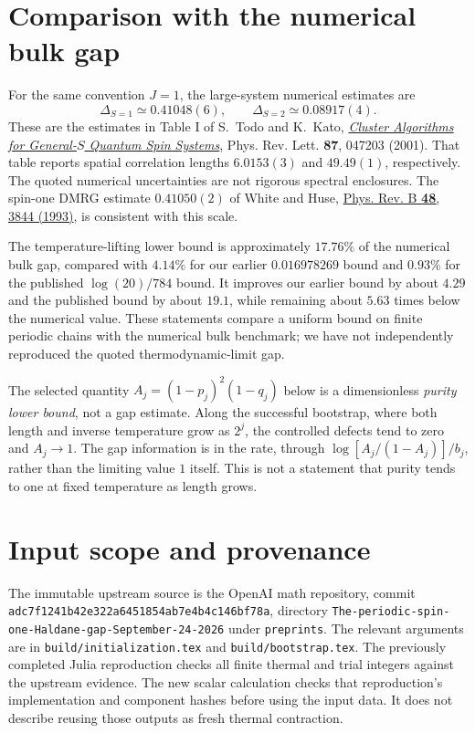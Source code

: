 \documentclass[11pt]{article}
\begin{document}
\section{Comparison with the numerical bulk gap}
For the same convention $J=1$, the large-system numerical estimates are
\[
 \Delta_{S=1}\simeq0.41048(6),\qquad
 \Delta_{S=2}\simeq0.08917(4).
\]
These are the estimates in Table I of S.~Todo and K.~Kato,
\href{https://arxiv.org/abs/cond-mat/9911047}{\emph{Cluster Algorithms for
General-$S$ Quantum Spin Systems}}, Phys. Rev. Lett. \textbf{87}, 047203 (2001).
That table reports spatial correlation lengths $6.0153(3)$ and $49.49(1)$,
respectively. The quoted numerical uncertainties are not rigorous spectral
enclosures. The spin-one DMRG estimate $0.41050(2)$ of White and Huse,
\href{https://doi.org/10.1103/PhysRevB.48.3844}{Phys. Rev. B \textbf{48}, 3844
(1993)}, is consistent with this scale.

The temperature-lifting lower bound is approximately $17.76\%$ of the
numerical bulk gap, compared with $4.14\%$ for our earlier $0.016978269$
bound and $0.93\%$ for the published $\log(20)/784$ bound.
It improves our earlier bound by about $4.29$ and the published bound by
about $19.1$, while remaining about $5.63$ times below the numerical value.
These statements compare
a uniform bound on finite periodic chains with the numerical bulk benchmark;
we have not independently reproduced the quoted thermodynamic-limit gap.

The selected quantity $A_j=(1-p_j)^2(1-q_j)$ below is a dimensionless
\emph{purity lower bound}, not a gap estimate. Along the successful bootstrap,
where both length and inverse temperature grow as $2^j$, the controlled
defects tend to zero and $A_j\to1$. The gap information is in the rate,
through $\log[A_j/(1-A_j)]/b_j$, rather than the limiting value $1$ itself.
This is not a statement that purity tends to one at fixed temperature as
length grows.

\section{Input scope and provenance}
The immutable upstream source is the OpenAI math repository, commit
\texttt{adc7f1241b42e322a6451854ab7e4b4c146bf78a}, directory
\texttt{The-periodic-spin-one-Haldane-gap-September-24-2026} under
\texttt{preprints}. The relevant arguments are in
\texttt{build/initialization.tex} and \texttt{build/bootstrap.tex}.
The previously completed Julia reproduction checks all finite thermal and
trial integers against the upstream evidence. The new scalar calculation
checks that reproduction's implementation and component hashes before using
the input data. It does not describe reusing those outputs as fresh thermal
contraction.
\end{document}
